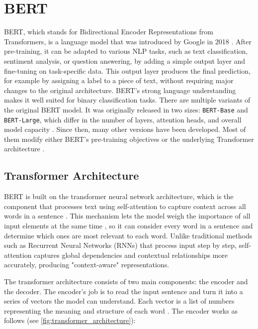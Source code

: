 
\section{BERT}
BERT, which stands for Bidirectional Encoder Representations from Transformers, is a language model that was introduced by Google in 2018 \parencite{devlinBERTPretrainingDeep2019}. After pre-training, it can be adapted to various NLP tasks, such as text classification, sentiment analysis, or question answering, by adding a simple output layer and fine-tuning on task-specific data. This output layer produces the final prediction, for example by assigning a label to a piece of text, without requiring major changes to the original architecture. BERT’s strong language understanding makes it well suited for binary classification tasks. There are multiple variants of the original BERT model. It was originally released in two sizes: \texttt{BERT-Base} and \texttt{BERT-Large}, which differ in the number of layers, attention heads, and overall model capacity \parencite{devlinBERTPretrainingDeep2019}. Since then, many other versions have been developed. Most of them modify either BERT’s pre-training objectives or the underlying Transformer architecture \parencite{libovickyHowLanguageNeutralMultilingual2019}.

\subsection{Transformer Architecture} \label{subsection:transformer_arch}
    BERT is built on the transformer neural network architecture, which is the component that processes text using self-attention to capture context across all words in a sentence \parencite{phuongFormalAlgorithmsTransformers2022}. This mechanism lets the model weigh the importance of all input elements at the same time \parencite{xiaoIntroductionTransformersNLP2023}, so it can consider every word in a sentence and determine which ones are most relevant to each word. Unlike traditional methods such as Recurrent Neural Networks (RNNs) that process input step by step, self-attention captures global dependencies and contextual relationships more accurately, producing "context-aware" representations. 

    The transformer architecture consists of two main components: the encoder and the decoder. The encoder’s job is to read the input sentence and turn it into a series of vectors the model can understand. Each vector is a list of numbers representing the meaning and structure of each word \parencite{xiaoIntroductionTransformersNLP2023}. The encoder works as follows (see \autoref{fig:transformer_architecture}):

